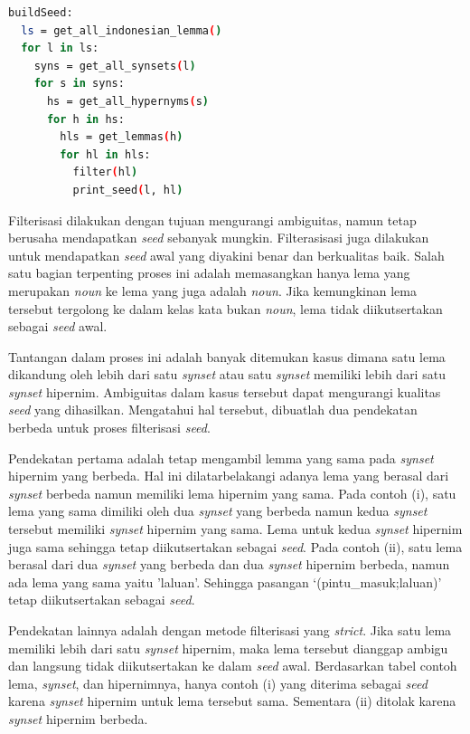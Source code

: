 \begin{lstlisting}[caption={Algoritme pembentukan \textit{seed}}, language=bash]
buildSeed:
  ls = get_all_indonesian_lemma()
  for l in ls:
    syns = get_all_synsets(l)
    for s in syns:
      hs = get_all_hypernyms(s)
      for h in hs: 
        hls = get_lemmas(h)
        for hl in hls:
          filter(hl)
          print_seed(l, hl)
\end{lstlisting}

Filterisasi dilakukan dengan tujuan mengurangi ambiguitas, namun tetap berusaha mendapatkan \textit{seed} sebanyak mungkin. Filterasisasi juga dilakukan untuk mendapatkan \textit{seed} awal yang diyakini benar dan berkualitas baik. Salah satu bagian terpenting proses ini adalah memasangkan hanya lema yang merupakan \textit{noun} ke lema yang juga adalah \textit{noun}. Jika kemungkinan lema tersebut tergolong ke dalam kelas kata bukan \textit{noun}, lema tidak diikutsertakan sebagai \textit{seed} awal.

Tantangan dalam proses ini adalah banyak ditemukan kasus dimana satu lema dikandung oleh lebih dari satu \textit{synset} atau satu \textit{synset} memiliki lebih dari satu \textit{synset} hipernim. Ambiguitas dalam kasus tersebut dapat mengurangi kualitas \textit{seed} yang dihasilkan. Mengatahui hal tersebut, dibuatlah dua pendekatan berbeda untuk proses filterisasi \textit{seed}.

Pendekatan pertama adalah tetap mengambil lemma yang sama pada \textit{synset} hipernim yang berbeda. Hal ini dilatarbelakangi adanya lema yang berasal dari \textit{synset} berbeda namun memiliki lema hipernim yang sama. Pada contoh (i), satu lema yang sama dimiliki oleh dua \textit{synset} yang berbeda namun kedua \textit{synset} tersebut memiliki \textit{synset} hipernim yang sama. Lema untuk kedua \textit{synset} hipernim juga sama sehingga tetap diikutsertakan sebagai \textit{seed}. Pada contoh (ii), satu lema berasal dari dua \textit{synset} yang berbeda dan dua \textit{synset} hipernim berbeda, namun ada lema yang sama yaitu 'laluan'. Sehingga pasangan `(pintu\_masuk;laluan)' tetap diikutsertakan sebagai \textit{seed}.

Pendekatan lainnya adalah dengan metode filterisasi yang \textit{strict}. Jika satu lema memiliki lebih dari satu \textit{synset} hipernim, maka lema tersebut dianggap ambigu dan langsung tidak diikutsertakan ke dalam \textit{seed} awal. Berdasarkan tabel contoh lema, \textit{synset}, dan hipernimnya, hanya contoh (i) yang diterima sebagai \textit{seed} karena \textit{synset} hipernim untuk lema tersebut sama. Sementara (ii) ditolak karena \textit{synset} hipernim berbeda.

